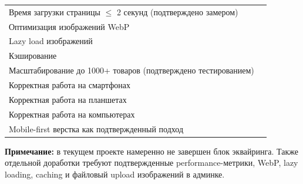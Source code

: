 \documentclass[12pt,a4paper]{article}
\newcommand{\done}{\ding{51}}
\newcommand{\notdone}{\ding{113}}
\begin{document}
\begin{longtable}{>{\raggedright\arraybackslash}p{} >{\centering\arraybackslash}p{}}
Время загрузки страницы $\leq$ 2 секунд (подтверждено замером) & \notdone \\
Оптимизация изображений WebP & \notdone \\
Lazy load изображений & \notdone \\
Кэширование & \notdone \\
Масштабирование до 1000+ товаров (подтверждено тестированием) & \notdone \\

Корректная работа на смартфонах & \done \\
Корректная работа на планшетах & \done \\
Корректная работа на компьютерах & \done \\
Mobile-first верстка как подтвержденный подход & \notdone \\

\bottomrule
\end{longtable}

\vspace{8pt}
\textbf{Примечание:} в текущем проекте намеренно не завершен блок эквайринга. Также отдельной доработки требуют подтвержденные performance-метрики, WebP, lazy loading, caching и файловый upload изображений в админке.
\end{document}
